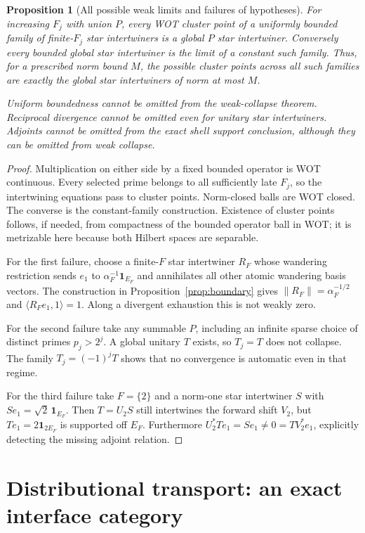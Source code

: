 \documentclass[11pt]{article}
\newtheorem{proposition}[theorem]{Proposition}
\theoremstyle{remark}
\newcommand{\one}{\mathbf 1}
\begin{document}
\begin{proposition}[All possible weak limits and failures of hypotheses]\label{prop:mutations}
For increasing $F_j$ with union $P$, every WOT cluster point of a uniformly
bounded family of finite-$F_j$ star intertwiners is a global $P$ star
intertwiner.  Conversely every bounded global star intertwiner is the
limit of a constant such family.  Thus, for a prescribed norm bound $M$,
the possible cluster points across all such families are exactly the
global star intertwiners of norm at most $M$.

Uniform boundedness cannot be omitted from the weak-collapse theorem.
Reciprocal divergence cannot be omitted even for unitary star intertwiners.
Adjoints cannot be omitted from the exact shell support conclusion,
although they can be omitted from weak collapse.
\end{proposition}
\begin{proof}
Multiplication on either side by a fixed bounded operator is WOT
continuous.  Every selected prime belongs to all sufficiently late $F_j$,
so the intertwining equations pass to cluster points.  Norm-closed balls
are WOT closed.  The converse is the constant-family construction.
Existence of cluster points follows, if needed, from compactness of the
bounded operator ball in WOT; it is metrizable here because both Hilbert
spaces are separable.

For the first failure, choose a finite-$F$ star intertwiner $R_F$ whose
wandering restriction sends $e_1$ to $\alpha_F^{-1}\one_{E_F}$ and
annihilates all other atomic wandering basis vectors.  The construction
in Proposition~\ref{prop:boundary} gives
$\|R_F\|=\alpha_F^{-1/2}$ and
$\langle R_Fe_1,1\rangle=1$.  Along a divergent exhaustion this is not
weakly zero.

For the second failure take any summable $P$, including an infinite
sparse choice of distinct primes $p_j>2^j$.  A global unitary $T$ exists,
so $T_j=T$ does not collapse.  The family $T_j=(-1)^jT$ shows that no
convergence is automatic even in that regime.

For the third failure take $F=\{2\}$ and a norm-one star intertwiner
$S$ with $Se_1=\sqrt2\,\one_{E_F}$.  Then $T=U_2S$ still intertwines the
forward shift $V_2$, but $Te_1=2\one_{2E_F}$ is supported off $E_F$.
Furthermore $U_2^*Te_1=Se_1\ne0=TV_2^*e_1$, explicitly detecting the
missing adjoint relation.
\end{proof}

\section{Distributional transport: an exact interface category}
\end{document}
